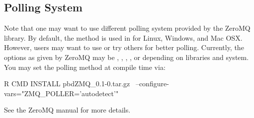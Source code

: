 \subsection{Polling System}

Note that one may want to use different polling system provided by 
the ZeroMQ library.  By default, the  method is used in 
 for Linux, Windows, and Mac OSX. However, users may want to use 
 or try others for better polling. Currently, the options as 
given by ZeroMQ may be , , , 
, or  depending on libraries and system. You may set 
the polling method at compile time via:
\begin{Command}
R CMD INSTALL pbdZMQ_0.1-0.tar.gz \
  --configure-vars="ZMQ_POLLER='autodetect'"
\end{Command}
See the ZeroMQ manual for more details.